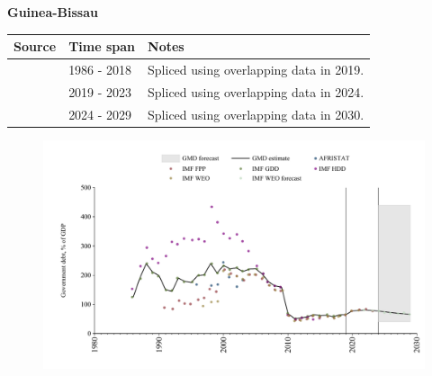 \documentclass[12pt,a4paper,landscape]{article}
\begin{document}
\begin{adjustbox}{max totalsize={\paperwidth}{\paperheight},center}
\begin{minipage}[t][\textheight][t]{\textwidth}
\vspace*{0.5cm}
{}
\begin{center}
{\Large\bfseries Guinea-Bissau}
\end{center}
\vspace{0.5cm}
\begin{table}[H]
\centering
\small
\begin{tabular}{|l|l|l|}
\hline
\textbf{Source} & \textbf{Time span} & \textbf{Notes} \\
\hline
\rowcolor{white}\cite{IMF_GDD}& 1986 - 2018 &Spliced using overlapping data in 2019.\\
\rowcolor{lightgray}\cite{IMF_FPP}& 2019 - 2023 &Spliced using overlapping data in 2024.\\
\rowcolor{white}\cite{IMF_WEO_forecast}& 2024 - 2029 &Spliced using overlapping data in 2030.\\
\hline
\end{tabular}
\end{table}
\begin{figure}[H]
\centering
\includegraphics[width=\textwidth,height=0.6\textheight,keepaspectratio]{graphs/GNB_govdebt_GDP.pdf}
\end{figure}
\end{minipage}
\end{adjustbox}
\end{document}
